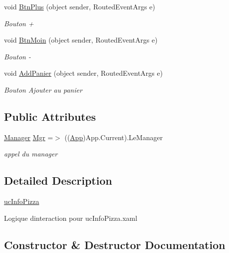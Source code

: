 \begin{DoxyCompactItemize}
void \hyperlink{classnewPizza1_1_1ucInfoPizza_a7edd9606b816156d4b04e9f3126bda3a}{Btn\+Plus} (object sender, Routed\+Event\+Args e)
\begin{DoxyCompactList}\small\item\em Bouton + \end{DoxyCompactList}\item 
void \hyperlink{classnewPizza1_1_1ucInfoPizza_a6c34810b0c856bfb31a50fe26bc83368}{Btn\+Moin} (object sender, Routed\+Event\+Args e)
\begin{DoxyCompactList}\small\item\em Bouton -\/ \end{DoxyCompactList}\item 
void \hyperlink{classnewPizza1_1_1ucInfoPizza_a5787ca97276bd3d501d9a8c029ad25ec}{Add\+Panier} (object sender, Routed\+Event\+Args e)
\begin{DoxyCompactList}\small\item\em Bouton Ajouter au panier \end{DoxyCompactList}\end{DoxyCompactItemize}
\subsection*{Public Attributes}
\begin{DoxyCompactItemize}
\item 
\hyperlink{classModele_1_1Manager}{Manager} \hyperlink{classnewPizza1_1_1ucInfoPizza_ade399f2ed146dd3b5b0a4784a8670652}{Mgr} =$>$ ((\hyperlink{classnewPizza1_1_1App}{App})App.\+Current).Le\+Manager
\begin{DoxyCompactList}\small\item\em appel du manager \end{DoxyCompactList}\end{DoxyCompactItemize}


\subsection{Detailed Description}
\hyperlink{classnewPizza1_1_1ucInfoPizza}{uc\+Info\+Pizza} 

Logique d\textquotesingle{}interaction pour uc\+Info\+Pizza.\+xaml 

\subsection{Constructor \& Destructor Documentation}
\mbox{\label{classnewPizza1_1_1ucInfoPizza_aa43d76da91b98d3f8367d06832249f98}} 
